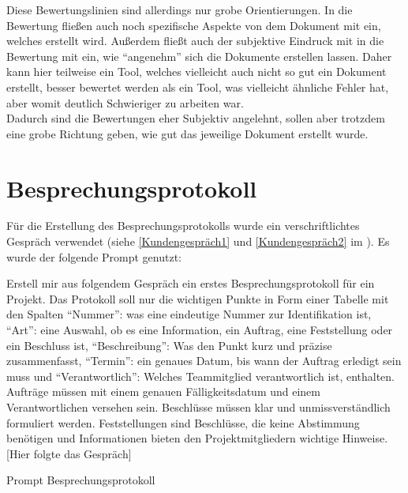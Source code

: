 Diese Bewertungslinien sind allerdings nur grobe Orientierungen. In die Bewertung fließen auch noch spezifische 
Aspekte von dem Dokument mit ein, welches erstellt wird. Außerdem fließt auch der subjektive Eindruck mit in die 
Bewertung mit ein, wie ``angenehm'' sich die Dokumente erstellen lassen. Daher kann hier teilweise ein Tool, welches 
vielleicht auch nicht so gut ein Dokument erstellt, besser bewertet werden als ein Tool, was vielleicht ähnliche 
Fehler hat, aber womit deutlich Schwieriger zu arbeiten war.\\
Dadurch sind die Bewertungen eher Subjektiv angelehnt, sollen aber trotzdem eine grobe Richtung geben, wie gut das 
jeweilige Dokument erstellt wurde.


\section{Besprechungsprotokoll}  \label{CompBesprechungsprotokoll}

Für die Erstellung des Besprechungsprotokolls wurde ein verschriftlichtes Gespräch verwendet 
(siehe \autoref{Kundengespräch1} und \autoref{Kundengespräch2} im ). Es wurde der folgende Prompt 
genutzt:

\begin{prompt}[H]
    \begin{tcolorbox}[colback=gray!20, colframe=gray!20, boxrule=0pt, sharp corners] 
        Erstell mir aus folgendem Gespräch ein erstes Besprechungsprotokoll für ein Projekt. Das Protokoll soll nur 
        die wichtigen Punkte in Form einer Tabelle mit den Spalten ``Nummer'': was eine eindeutige Nummer zur 
        Identifikation ist, ``Art'': eine Auswahl, ob es eine Information, ein Auftrag, eine Feststellung oder ein 
        Beschluss ist, ``Beschreibung'': Was den Punkt kurz und präzise zusammenfasst, ``Termin'': ein genaues Datum, bis 
        wann der Auftrag erledigt sein muss und ``Verantwortlich'': Welches Teammitglied verantwortlich ist, enthalten. 
        Aufträge müssen mit einem genauen Fälligkeitsdatum und einem Verantwortlichen versehen sein. Beschlüsse 
        müssen klar und unmissverständlich formuliert werden. Feststellungen sind Beschlüsse, die keine Abstimmung 
        benötigen und Informationen bieten den Projektmitgliedern wichtige Hinweise. 
        [Hier folgte das Gespräch]
        \vfill
    \end{tcolorbox}
    \caption{Prompt Besprechungsprotokoll}
    \label{Prompt Besprechungsprotokoll}
\end{prompt}

